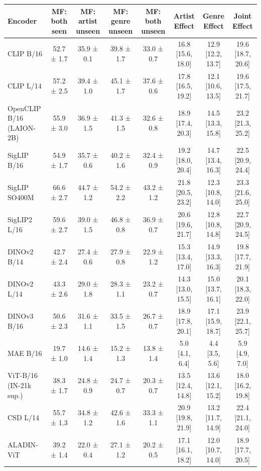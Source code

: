 \begin{tabular}{lccccccc}
\toprule
Encoder & MF: both seen & MF: artist unseen & MF: genre unseen & MF: both unseen & Artist Effect & Genre Effect & Joint Effect \\
\midrule
CLIP B/16 & 52.7 ± 1.7 & 35.9 ± 0.1 & 39.8 ± 1.7 & 33.0 ± 0.7 & 16.8 [15.6, 18.0] & 12.9 [12.2, 13.7] & 19.6 [18.7, 20.6] \\
CLIP L/14 & 57.2 ± 2.5 & 39.4 ± 1.0 & 45.1 ± 1.7 & 37.6 ± 0.6 & 17.8 [16.5, 19.2] & 12.1 [10.6, 13.5] & 19.6 [17.5, 21.7] \\
OpenCLIP B/16 (LAION-2B) & 55.9 ± 3.0 & 36.9 ± 1.5 & 41.3 ± 1.5 & 32.6 ± 0.8 & 18.9 [17.4, 20.3] & 14.5 [13.3, 15.8] & 23.2 [21.3, 25.2] \\
SigLIP B/16 & 54.9 ± 1.7 & 35.7 ± 0.6 & 40.2 ± 1.6 & 32.4 ± 0.9 & 19.2 [18.0, 20.4] & 14.7 [13.4, 16.3] & 22.5 [20.9, 24.4] \\
SigLIP SO400M & 66.6 ± 2.7 & 44.7 ± 1.2 & 54.2 ± 2.2 & 43.2 ± 1.2 & 21.8 [20.5, 23.2] & 12.3 [10.8, 14.0] & 23.3 [21.6, 25.0] \\
SigLIP2 L/16 & 59.6 ± 2.7 & 39.0 ± 1.5 & 46.8 ± 0.8 & 36.9 ± 0.7 & 20.6 [19.6, 21.7] & 12.8 [10.8, 14.8] & 22.7 [20.9, 24.5] \\
DINOv2 B/14 & 42.7 ± 2.4 & 27.4 ± 0.6 & 27.9 ± 0.8 & 22.9 ± 1.2 & 15.3 [13.4, 17.0] & 14.9 [13.3, 16.3] & 19.8 [17.7, 21.9] \\
DINOv2 L/14 & 43.3 ± 2.6 & 29.0 ± 1.8 & 28.3 ± 1.1 & 23.2 ± 0.7 & 14.3 [13.0, 15.5] & 15.0 [13.7, 16.1] & 20.1 [18.3, 22.0] \\
DINOv3 B/16 & 50.6 ± 2.3 & 31.6 ± 1.1 & 33.5 ± 1.5 & 26.7 ± 0.7 & 18.9 [17.8, 20.1] & 17.1 [15.9, 18.7] & 23.9 [22.1, 25.7] \\
MAE B/16 & 19.7 ± 1.0 & 14.6 ± 1.4 & 15.2 ± 1.3 & 13.8 ± 1.4 & 5.0 [4.1, 6.4] & 4.4 [3.5, 5.6] & 5.9 [4.9, 7.0] \\
ViT-B/16 (IN-21k sup.) & 38.3 ± 1.7 & 24.8 ± 0.9 & 24.7 ± 0.7 & 20.3 ± 0.7 & 13.5 [12.4, 14.8] & 13.6 [12.1, 15.2] & 18.0 [16.2, 19.8] \\
CSD L/14 & 55.7 ± 1.3 & 34.8 ± 1.2 & 42.6 ± 1.6 & 33.3 ± 1.1 & 20.9 [19.8, 21.9] & 13.2 [11.7, 14.9] & 22.4 [21.1, 24.0] \\
ALADIN-ViT & 39.2 ± 1.4 & 22.0 ± 0.4 & 27.1 ± 1.2 & 20.2 ± 0.5 & 17.1 [16.1, 18.2] & 12.0 [10.7, 14.0] & 18.9 [17.7, 20.5] \\
\bottomrule
\end{tabular}
